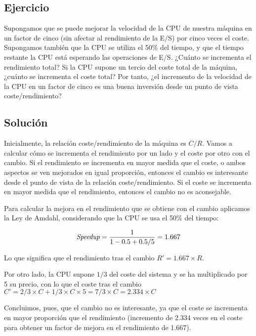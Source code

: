 \documentclass[12pt,onecolumn]{memoir}
\newenvironment{ejercicio}{%
    \def\FrameCommand{\fboxrule=\FrameRule\fboxsep=\FrameSep \fcolorbox{black}{metallic-green}}%
    \MakeFramed {\FrameRestore}}%
{\endMakeFramed}
\begin{document}
\begin{ejercicio}

\subsection*{Ejercicio}

Supongamos que se puede mejorar la velocidad de la CPU
de nuestra máquina en un factor de cinco (sin afectar al
rendimiento de la E/S) por cinco veces el coste. Supongamos
también que la CPU se utiliza el 50\% del tiempo, y que el tiempo
restante la CPU está esperando las operaciones de E/S. ¿Cuánto se
incrementa el rendimiento total? Si la CPU supone un tercio del 
coste total de la máquina, ¿cuánto se incrementa el coste total? 
Por tanto, ¿el incremento de la velocidad de la CPU en un factor 
de cinco es una buena inversión desde un punto de vista 
coste/rendimiento?

\subsection*{Solución}

Inicialmente, la relación coste/rendimiento de la máquina es $C/R$. Vamos a calcular cómo se incrementa el rendimiento por un lado y el coste por otro con el cambio. Si el rendimiento se incrementa en mayor medida que el coste, o ambos aspectos se ven mejorados en igual proporción, entonces el cambio es interesante desde el punto de vista de la relación coste/rendimiento. Si el coste se incrementa en mayor medida que el rendimiento, entonces el cambio no es aconsejable.

Para calcular la mejora en el rendimiento que se obtiene con el cambio aplicamos la Ley de Amdahl, considerando que la CPU se usa el 50\% del tiempo: 

\[\emph{Speedup} = \frac{1}{1-0.5 + 0.5/5} = 1.667\]

Lo que significa que el rendimiento tras el cambio $R' = 1.667 \times R$.

Por otro lado, la CPU supone $1/3$ del coste del sistema y se ha multiplicado por 5 su precio, con lo que el coste tras el cambio $C' = 2/3 \times C + 1/3 \times C \times 5 = 7/3 \times C = 2.334 \times C$

Concluimos, pues, que el cambio no es interesante, ya que el coste se incrementa en mayor proporción que el rendimiento (incremento de 2.334 veces en el coste para obtener un factor de mejora en el rendimiento de 1.667).

\end{ejercicio}
\end{document}

